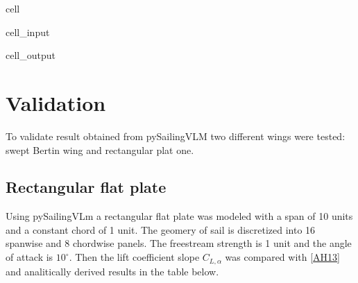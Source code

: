 \documentclass[letterpaper,10pt,english]{jupyterBook}
\begin{document}
\begin{sphinxuseclass}{cell}\begin{sphinxVerbatimInput}

\begin{sphinxuseclass}{cell_input}
\begin{sphinxVerbatim}[commandchars=\\\{\}]
  
\end{sphinxVerbatim}

\end{sphinxuseclass}\end{sphinxVerbatimInput}
\begin{sphinxVerbatimOutput}

\begin{sphinxuseclass}{cell_output}
\end{sphinxuseclass}\end{sphinxVerbatimOutput}

\end{sphinxuseclass}
\sphinxstepscope


\chapter{Validation}
\label{\detokenize{chapters/validation/validation:validation}}\label{\detokenize{chapters/validation/validation::doc}}
\sphinxAtStartPar
To validate result obtained from pySailingVLM two different wings were tested: swept Bertin wing and rectangular plat one.

\sphinxstepscope


\section{Rectangular flat plate}
\label{\detokenize{chapters/validation/flat_plate:rectangular-flat-plate}}\label{\detokenize{chapters/validation/flat_plate::doc}}
\sphinxAtStartPar
Using pySailingVLm a rectangular flat plate was modeled with a span of 10 units and a constant chord of 1 unit. The geomery of sail is discretized into 16 spanwise and 8 chordwise panels. The free\sphinxhyphen{}stream strength is 1 unit and the angle of attack is \(10^\circ\). Then the lift coefficient slope  \(C_{L,\alpha}\) was compared with {[}\hyperlink{cite.chapters/bibliography:id3}{AH13}{]} and analitically derived results in the table below.
\end{document}

